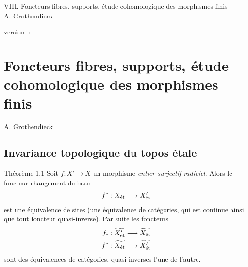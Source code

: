 \documentclass[10pt]{../fichiers-configuration-latex/smfart}
\begin{document}
\begin{center}
VIII. Foncteurs fibres, supports, étude cohomologique des morphismes finis\\
A. Grothendieck
\end{center}

version : \showgitstatus{}
\tableofcontents

\else
\chapter{Foncteurs fibres, supports, étude cohomologique des morphismes finis}
\begin{center}
A. Grothendieck
\end{center}
\fi

\setcounter{pageoriginal}{366}


\section{Invariance topologique du topos
  étale}

\begin{enonce*}{Théorème 1.1}
Soit \pageoriginale  $f : X'\to X$ un morphisme \emph{entier surjectif
radiciel}. Alors le foncteur changement de base
$$
f^{\ast} : X_{\text{\rm ét}} \to X'_{\text{\rm ét}}
$$
est une équivalence de sites (\ie une équivalence de catégories, qui
est continue ainsi que tout foncteur quasi-inverse). Par suite les
foncteurs
\begin{align*}
f_{\ast} : \widetilde{X'_{\text{\rm ét}}} &\to \widetilde{X_{\text{\rm ét}}}\\
f^{\ast} : \widetilde{X_{\text{\rm ét}}} &\to \widetilde{X'_{\text{\rm
      ét}}}
\end{align*}
sont des équivalences de catégories, quasi-inverses l'une de l'autre.
\end{enonce*}
\end{document}
